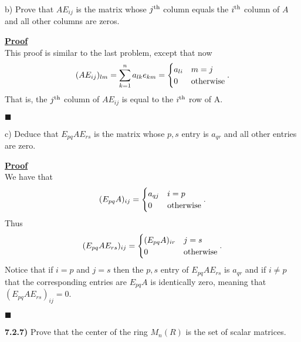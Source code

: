 \documentclass[12pt,a4paper]{article}
\newcommand{\prob}[2]{\textbf{#1)} #2}
\newenvironment{proof}
{
\textbf{\underline{Proof}} \\
}
{
\begin{flushright}
$\blacksquare$
\end{flushright}}
\begin{document}
b) Prove that $AE_{ij}$ is the matrix whose $j^{\rm th}$ column equals the $i^{\rm th}$ column of $A$ and all other columns are zeros.

\begin{proof}
    This proof is similar to the last problem, except that now
    \begin{align*}
        (AE_{ij})_{lm} = \sum_{k=1}^{n} a_{lk}e_{km} = \begin{cases}
            a_{li} & m=j \\
            0 & {\rm otherwise}
        \end{cases}
    .\end{align*}
    That is, the $j^{\rm th}$ column of $AE_{ij}$ is equal to the $i^{\rm th}$ row of A.
\end{proof}

c) Deduce that $E_{pq}AE_{rs}$ is the matrix whose $p,s$ entry is $a_{qr}$ and all other entries are zero.

\begin{proof}
    We have that
    \begin{align*}
        (E_{pq}A)_{ij} = \begin{cases}
            a_{qj} & i=p \\
            0 & {\rm otherwise}
        \end{cases}
    .\end{align*}   
    Thus 
    \begin{align*}
        (E_{pq}AE_{rs})_{ij} = \begin{cases}
            (E_{pq}A)_{ir} & j=s \\
            0 & {\rm otherwise}
        \end{cases}
    .\end{align*}
    Notice that if $i=p$ and $j=s$ then the $p,s$ entry of $E_{pq}AE_{rs}$ is $a_{qr}$ and if $i \ne p$ that the corresponding entries are $E_{pq}A$ is identically zero, meaning that $(E_{pq}AE_{rs})_{ij} = 0$.
\end{proof}

\prob{7.2.7}{
Prove that the center of the ring $M_{n}(R)$ is the set of scalar matrices.
}
\end{document}
